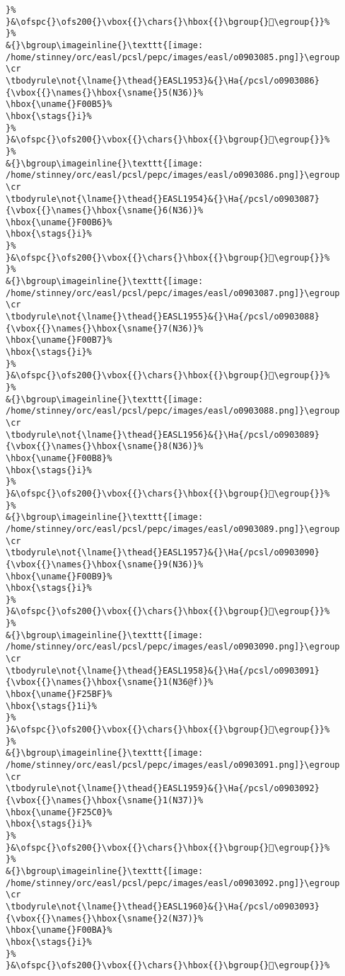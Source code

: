 \begin{verbatim}
}%
}&\ofspc{}\ofs200{}\vbox{{}\chars{}\hbox{{}\bgroup{}󲙖\egroup{}}%
}%
&{}\bgroup\imageinline{}\texttt{[image: /home/stinney/orc/easl/pcsl/pepc/images/easl/o0903085.png]}\egroup
\cr
\tbodyrule\not{\lname{}\thead{}EASL1953}&{}\Ha{/pcsl/o0903086}{\vbox{{}\names{}\hbox{\sname{}5(N36)}%
\hbox{\uname{}F00B5}%
\hbox{\stags{}i}%
}%
}&\ofspc{}\ofs200{}\vbox{{}\chars{}\hbox{{}\bgroup{}󰂵\egroup{}}%
}%
&{}\bgroup\imageinline{}\texttt{[image: /home/stinney/orc/easl/pcsl/pepc/images/easl/o0903086.png]}\egroup
\cr
\tbodyrule\not{\lname{}\thead{}EASL1954}&{}\Ha{/pcsl/o0903087}{\vbox{{}\names{}\hbox{\sname{}6(N36)}%
\hbox{\uname{}F00B6}%
\hbox{\stags{}i}%
}%
}&\ofspc{}\ofs200{}\vbox{{}\chars{}\hbox{{}\bgroup{}󰂶\egroup{}}%
}%
&{}\bgroup\imageinline{}\texttt{[image: /home/stinney/orc/easl/pcsl/pepc/images/easl/o0903087.png]}\egroup
\cr
\tbodyrule\not{\lname{}\thead{}EASL1955}&{}\Ha{/pcsl/o0903088}{\vbox{{}\names{}\hbox{\sname{}7(N36)}%
\hbox{\uname{}F00B7}%
\hbox{\stags{}i}%
}%
}&\ofspc{}\ofs200{}\vbox{{}\chars{}\hbox{{}\bgroup{}󰂷\egroup{}}%
}%
&{}\bgroup\imageinline{}\texttt{[image: /home/stinney/orc/easl/pcsl/pepc/images/easl/o0903088.png]}\egroup
\cr
\tbodyrule\not{\lname{}\thead{}EASL1956}&{}\Ha{/pcsl/o0903089}{\vbox{{}\names{}\hbox{\sname{}8(N36)}%
\hbox{\uname{}F00B8}%
\hbox{\stags{}i}%
}%
}&\ofspc{}\ofs200{}\vbox{{}\chars{}\hbox{{}\bgroup{}󰂸\egroup{}}%
}%
&{}\bgroup\imageinline{}\texttt{[image: /home/stinney/orc/easl/pcsl/pepc/images/easl/o0903089.png]}\egroup
\cr
\tbodyrule\not{\lname{}\thead{}EASL1957}&{}\Ha{/pcsl/o0903090}{\vbox{{}\names{}\hbox{\sname{}9(N36)}%
\hbox{\uname{}F00B9}%
\hbox{\stags{}i}%
}%
}&\ofspc{}\ofs200{}\vbox{{}\chars{}\hbox{{}\bgroup{}󰂹\egroup{}}%
}%
&{}\bgroup\imageinline{}\texttt{[image: /home/stinney/orc/easl/pcsl/pepc/images/easl/o0903090.png]}\egroup
\cr
\tbodyrule\not{\lname{}\thead{}EASL1958}&{}\Ha{/pcsl/o0903091}{\vbox{{}\names{}\hbox{\sname{}1(N36@f)}%
\hbox{\uname{}F25BF}%
\hbox{\stags{}1i}%
}%
}&\ofspc{}\ofs200{}\vbox{{}\chars{}\hbox{{}\bgroup{}󲖿\egroup{}}%
}%
&{}\bgroup\imageinline{}\texttt{[image: /home/stinney/orc/easl/pcsl/pepc/images/easl/o0903091.png]}\egroup
\cr
\tbodyrule\not{\lname{}\thead{}EASL1959}&{}\Ha{/pcsl/o0903092}{\vbox{{}\names{}\hbox{\sname{}1(N37)}%
\hbox{\uname{}F25C0}%
\hbox{\stags{}i}%
}%
}&\ofspc{}\ofs200{}\vbox{{}\chars{}\hbox{{}\bgroup{}󲗀\egroup{}}%
}%
&{}\bgroup\imageinline{}\texttt{[image: /home/stinney/orc/easl/pcsl/pepc/images/easl/o0903092.png]}\egroup
\cr
\tbodyrule\not{\lname{}\thead{}EASL1960}&{}\Ha{/pcsl/o0903093}{\vbox{{}\names{}\hbox{\sname{}2(N37)}%
\hbox{\uname{}F00BA}%
\hbox{\stags{}i}%
}%
}&\ofspc{}\ofs200{}\vbox{{}\chars{}\hbox{{}\bgroup{}󰂺\egroup{}}%

\end{verbatim}
